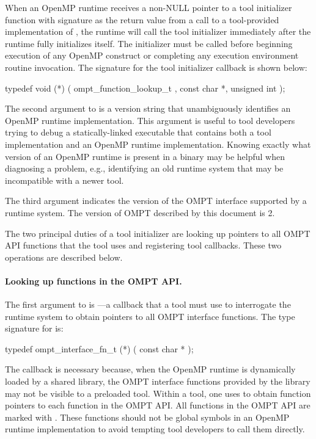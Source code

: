 \documentclass{article}
\begin{document}
When an OpenMP runtime receives a non-NULL pointer to a tool initializer function with signature  as the return value from a call to a tool-provided implementation of , the runtime will call the tool initializer immediately after the runtime fully initializes itself. The initializer must be called before beginning execution of any OpenMP construct or completing any execution environment  routine invocation.  The signature for the tool initializer callback is shown below:

\begin{boxedcode}
typedef void (*) (
  ompt\_function\_lookup\_t ,
  const char *, 
  unsigned int 
);
\end{boxedcode}
The second argument to   is a version string that unambiguously identifies an OpenMP runtime implementation. This argument is useful to tool developers trying to debug a statically-linked executable that contains both a tool implementation and an OpenMP runtime implementation. Knowing exactly what version of an OpenMP runtime is present in a binary may be helpful when diagnosing a problem, e.g., identifying an old runtime system that may be incompatible with a newer tool.

The third argument  indicates the version of the OMPT interface supported by a runtime system.
The version of OMPT described by this document is 2.

The two principal duties of a tool initializer are looking up pointers to all OMPT API functions that the tool uses and registering tool callbacks.  These two operations are described below.

\paragraph{Looking up functions in the OMPT API.} The first argument to  is ---a callback that a tool must use to interrogate the runtime system to obtain pointers to all OMPT interface functions.
The type signature for   is:

\begin{boxedcode}
typedef ompt\_interface\_fn\_t (*) (
  const char *
);
\end{boxedcode}

\noindent
The  callback is necessary because, when the OpenMP runtime is dynamically loaded by a shared library, the OMPT interface functions provided by the library may not be visible to a preloaded tool. Within a tool, one uses  to obtain function pointers to each function in the OMPT API.  All functions in the OMPT API are marked with . These functions should not be global symbols in an OpenMP runtime implementation to avoid tempting tool developers to call them directly. 
\end{document}
